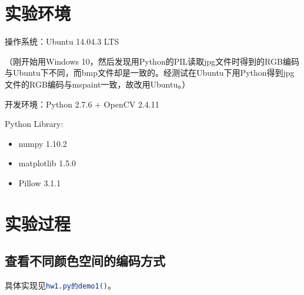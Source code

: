 \documentclass[a4paper, 12pt, UTF8]{article}
\begin{document}
\section{实验环境}

操作系统：Ubuntu 14.04.3 LTS

（刚开始用Windows 10，然后发现用Python的PIL读取jpg文件时得到的RGB编码与Ubuntu下不同，而bmp文件却是一致的。经测试在Ubuntu下用Python得到jpg文件的RGB编码与mspaint一致，故改用Ubuntu。）

开发环境：Python 2.7.6 + OpenCV 2.4.11

Python Library:

\vspace{-6pt}
\begin{itemize}

\setlength{\itemsep}{0pt}

\item numpy 1.10.2

\item matplotlib 1.5.0

\item Pillow 3.1.1

\end{itemize}

\section{实验过程}

\subsection{查看不同颜色空间的编码方式}

具体实现见\lstinline[language=bash]{hw1.py的demo1()}。
\end{document}

